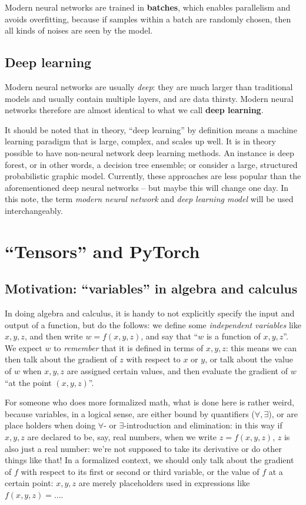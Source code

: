 \documentclass[hyperref, a4paper, 12pt]{report}
\newcommand*{\concept}[1]{{\textbf{#1}}}
\begin{document}
Modern neural networks are trained in \concept{batches},
which enables parallelism and avoids overfitting,
because if samples within a batch are randomly chosen,
then all kinds of noises are seen by the model.

\subsection{Deep learning}

Modern neural networks are usually \emph{deep}:
they are much larger than traditional models and usually contain multiple layers,
and are data thirsty.
Modern neural networks therefore are almost identical to what we call \concept{deep learning}.

It should be noted that in theory, ``deep learning'' by definition means a machine learning paradigm that is large, complex, and scales up well.
It is in theory possible to have non-neural network deep learning methods.
An instance is deep forest, or in other words, a decision tree ensemble;
or consider a large, structured probabilistic graphic model.
Currently, these approaches are less popular than the aforementioned deep neural networks
-- but maybe this will change one day.
In this note, the term \emph{modern neural network} and \emph{deep learning model} will be used interchangeably.

\section{``Tensors'' and PyTorch}\label{sec:tensor}

\subsection{Motivation: ``variables'' in algebra and calculus}
In doing algebra and calculus, it is handy to not explicitly specify the input and output of a function, but do the follows:
we define some \emph{independent variables} like $x, y, z$,
and then write $w = f(x, y, z)$, and say that ``$w$ is a function of $x, y, z$''.
We expect $w$ to \emph{remember} that it is defined in terms of $x, y, z$:
this means we can then talk about the gradient of $z$ with respect to $x$ or $y$,
or talk about the value of $w$ when $x, y, z$ are assigned certain values,
and then evaluate the gradient of $w$ ``at the point $(x, y, z)$''.

For someone who does more formalized math,
what is done here is rather weird, because variables, in a logical sense,
are either bound by quantifiers ($\forall, \exists$),
or are place holders when doing $\forall$- or $\exists$-introduction and elimination:
in this way if $x, y, z$ are declared to be, say, real numbers,
when we write $z = f(x, y, z)$,
$z$ is also just a real number:
we're not supposed to take its derivative or do other things like that!
In a formalized context, we should only talk about the gradient of $f$ with respect to its first or second or third variable,
or the value of $f$ at a certain point:
$x, y ,z$ are merely placeholders used in expressions like $f(x, y, z) = \dots$.
\end{document}

